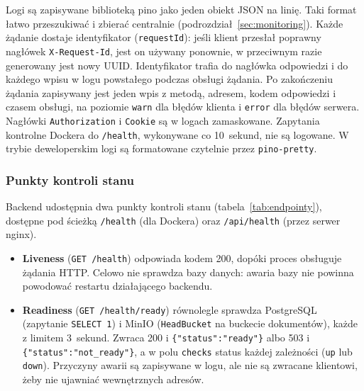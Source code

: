 Logi są zapisywane biblioteką pino jako jeden obiekt JSON na
linię. Taki format łatwo przeszukiwać i zbierać centralnie
(podrozdział~\ref{sec:monitoring}). Każde żądanie dostaje identyfikator
(\texttt{requestId}): jeśli klient przesłał poprawny nagłówek
\texttt{X-Request-Id}, jest on używany ponownie, w przeciwnym razie
generowany jest nowy UUID. Identyfikator trafia do nagłówka odpowiedzi i do
każdego wpisu w logu powstałego podczas obsługi żądania. Po zakończeniu
żądania zapisywany jest jeden wpis z metodą, adresem, kodem odpowiedzi i czasem
obsługi, na poziomie \texttt{warn} dla błędów klienta i \texttt{error} dla
błędów serwera. Nagłówki \texttt{Authorization} i \texttt{Cookie} są w logach
zamaskowane. Zapytania kontrolne Dockera do \texttt{/health}, wykonywane co
10~sekund, nie są logowane. W trybie deweloperskim logi są formatowane
czytelnie przez \texttt{pino-pretty}.

\subsubsection{Punkty kontroli stanu}

Backend udostępnia dwa punkty kontroli stanu (tabela~\ref{tab:endpointy}),
dostępne pod ścieżką \texttt{/health} (dla Dockera) oraz \texttt{/api/health}
(przez serwer nginx).

\begin{itemize}
  \item \textbf{Liveness} (\texttt{GET /health}) odpowiada kodem 200, dopóki
        proces obsługuje żądania HTTP. Celowo nie sprawdza bazy danych:
        awaria bazy nie powinna powodować restartu działającego backendu.
  \item \textbf{Readiness} (\texttt{GET /health/ready}) równolegle sprawdza
        PostgreSQL (zapytanie \texttt{SELECT 1}) i MinIO (\texttt{HeadBucket}
        na buckecie dokumentów), każde z limitem 3~sekund. Zwraca 200 i
        \texttt{\{"status":"ready"\}} albo 503 i \texttt{\{"status":"not\_ready"\}},
        a w polu \texttt{checks} status każdej zależności (\texttt{up} lub
        \texttt{down}). Przyczyny awarii są zapisywane w logu, ale nie są
        zwracane klientowi, żeby nie ujawniać wewnętrznych adresów.
\end{itemize}

